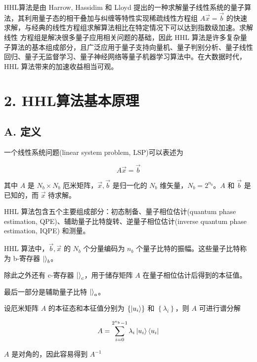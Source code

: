 \documentclass[aps,prl,twocolumn,groupedaddress]{revtex4-2}
\begin{document}
HHL算法是由 Harrow, Hassidim 和 Lloyd 提出的一种求解量子线性系统的量子算法，其利用量子态的相干叠加与纠缠等特性实现稀疏线性方程组 $A\vec{x}=\vec{b}$ 的快速求解，与经典的线性方程组求解算法相比在特定情况下可以达到指数级加速。求解线性
方程组是解决很多量子应用相关问题的基础，因此 HHL 算法是许多复杂量子算法的基本组成部分，且广泛应用于量子支持向量机、量子判别分析、量子线性回归、量子无监督学习、量子神经网络等量子机器学习算法中。在大数据时代，HHL 算法带来的加速收益相当可观。

\section{2. HHL算法基本原理}

\subsection{A. 定义}

一个线性系统问题(linear system problem, LSP)可以表述为

$$
A\vec{x} = \vec{b}
$$

其中 $A $ 是  $N_b\times N_b$ 厄米矩阵，$\vec{x},\vec{b}$ 是归一化的 $N_b$ 维矢量，$N_b=2^{n_b}$。$A$ 和 $\vec{b}$ 是已知的，而 $\vec{x}$ 待求解。

HHL 算法包含五个主要组成部分：初态制备、量子相位估计(quantum phase estimation, QPE)、辅助量子比特旋转、逆量子相位估计(inverse quantum phase estimation, IQPE) 和测量。

HHL 算法中，$\vec{b},\vec{x} $ 的 $N_b$ 个分量编码为 $n_b$ 个量子比特的振幅。这些量子比特称为 b-寄存器 $\ket{}_b$。

除此之外还有 c-寄存器 $\ket{}_c$，用于储存矩阵 $A$ 在量子相位估计后得到的本征值。

最后一部分是辅助量子比特 $\ket{}_a$。

设厄米矩阵 $A$ 的本征态和本征值分别为 $\left\{\ket{u_i} \right\}$ 和 $\left\{\lambda_i \right\}$，则 $A$ 可进行谱分解

$$
A = \sum_{i=0}^{2^{n_b}-1} \lambda_i \ket{u_i}\bra{u_i}
$$

$A$ 是对角的，因此容易得到 $A^{-1}$
\end{document}
